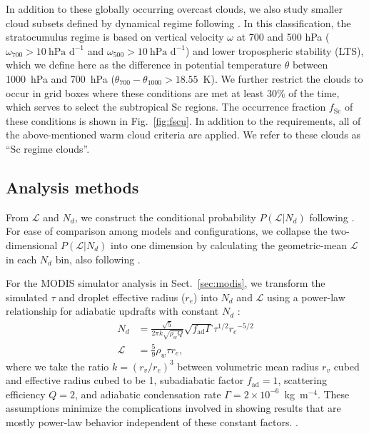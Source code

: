 \documentclass[acp, manuscript]{copernicus}\usepackage[]{graphicx}\usepackage[]{xcolor}
\newcommand\nd{\ensuremath{N_d}}
\newcommand\lwp{\ensuremath{\mathcal L}}
\newcommand\re{\ensuremath{r_e}}
\begin{document}
In addition to these globally occurring overcast clouds, we also study smaller
cloud subsets defined by dynamical regime following \citet{Medeiros2011}.  In
this classification, the stratocumulus regime is based on vertical velocity
$\omega$ at 700 and 500 hPa ($\omega_{700} > 10~\text{hPa d}^{-1}$ and
$\omega_{500} > 10~\text{hPa d}^{-1}$) and lower tropospheric stability (LTS),
which we define here as the difference in potential temperature $\theta$ between 1000~hPa and 700~hPa
($\theta_{700} - \theta_{1000} > 18.55$~K).  We further restrict the clouds to
occur in grid boxes where these conditions are met at least 30\% of the time,
which serves to select the subtropical Sc regions.  The occurrence
fraction $f_\text{Sc}$ of these conditions is shown in Fig.~\ref{fig:fscu}.
In addition to
the \citet{Medeiros2011} requirements, all of the above-mentioned warm cloud
criteria are applied.  We refer to these clouds
as ``Sc regime clouds''.  

\subsection{Analysis methods}

From \lwp{} and \nd{}, we construct the conditional probability
$P(\lwp|\nd)$ following \citet{Gryspeerdt2019}.  For ease of comparison among
models and configurations, we collapse the two-dimensional $P(\lwp|\nd)$ into
one dimension by calculating the geometric-mean \lwp{} in each \nd{} bin, also
following \citet{Gryspeerdt2019}.

For the MODIS simulator analysis in Sect.~\ref{sec:modis}, we transform the
simulated $\tau$ and droplet effective radius (\re{}) into \nd{} and \lwp{} using a power-law
relationship for adiabatic updrafts with constant \nd{}
\citep{Brenguier2000,Bennartz2007,Painemal2011,Grosvenor2018}:
\begin{align}
  \nd &=     \frac{\sqrt{5}}{2 \pi k \sqrt{\rho_w Q}} \sqrt{f_\text{ad}\Gamma} \tau^{1/2}  \re^{-5/2}  \\
  \lwp &= \frac{5}{9} \rho_w \tau  \re,
\end{align}
where we take the ratio $k=(r_v/r_e)^3$ between volumetric mean radius $r_v$
cubed and effective radius cubed to be 1, subadiabatic factor $f_\text{ad}=1$, scattering efficiency $Q=2$, and
adiabatic condensation rate $\Gamma=2\times 10^{-6}$~kg~m$^{-4}$.  These assumptions minimize the
complications involved in showing results that are mostly power-law behavior
independent of these constant factors.  \citep[This does neglect important
modifications that can arise if these factors are not, in fact, constant;][]{Varble2023}.
\end{document}
